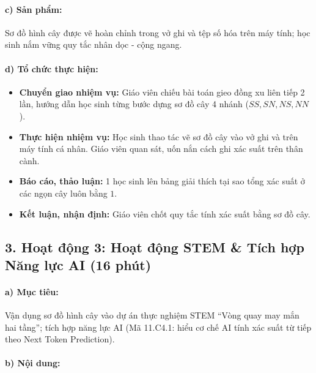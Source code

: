 \documentclass[12pt, a4paper]{article}
\begin{document}
\paragraph{c) Sản phẩm:} Sơ đồ hình cây được vẽ hoàn chỉnh trong vở ghi và tệp số hóa trên máy tính; học sinh nắm vững quy tắc nhân dọc - cộng ngang.

\paragraph{d) Tổ chức thực hiện:}
\begin{itemize}[leftmargin=0.8cm]
    \item \textbf{Chuyển giao nhiệm vụ:} Giáo viên chiếu bài toán gieo đồng xu liên tiếp 2 lần, hướng dẫn học sinh từng bước dựng sơ đồ cây 4 nhánh ($SS, SN, NS, NN$).
    \item \textbf{Thực hiện nhiệm vụ:} Học sinh thao tác vẽ sơ đồ cây vào vở ghi và trên máy tính cá nhân. Giáo viên quan sát, uốn nắn cách ghi xác suất trên thân cành.
    \item \textbf{Báo cáo, thảo luận:} 1 học sinh lên bảng giải thích tại sao tổng xác suất ở các ngọn cây luôn bằng $1$.
    \item \textbf{Kết luận, nhận định:} Giáo viên chốt quy tắc tính xác suất bằng sơ đồ cây.
\end{itemize}

\subsection*{3. Hoạt động 3: Hoạt động STEM \& Tích hợp Năng lực AI (16 phút)}

\paragraph{a) Mục tiêu:} Vận dụng sơ đồ hình cây vào dự án thực nghiệm STEM ``Vòng quay may mắn hai tầng''; tích hợp năng lực AI (Mã 11.C4.1: hiểu cơ chế AI tính xác suất từ tiếp theo Next Token Prediction).

\paragraph{b) Nội dung:}
\end{document}
